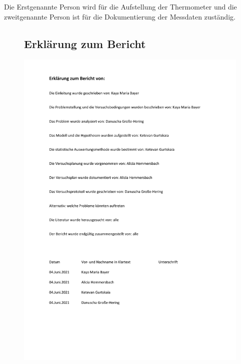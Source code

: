 \documentclass[ ngerman, fontsize= 12pt, paper=a4, headings=big, titlepage=true]{article}
\begin{document}
Die Erstgenannte Person wird für die Aufstellung der Thermometer und die zweitgenannte Person ist für die Dokumentierung der Messdaten zuständig.	

\begin{figure}[t]
	\subsection{Erklärung zum Bericht}
	\hspace{-2.3cm}
	\includegraphics[scale=0.8]{ErklaerungzumBericht}
\end{figure}
\end{document}
